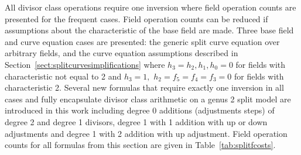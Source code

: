 All divisor class operations require one inversion where field operation counts
are presented for the frequent cases. Field operation counts can be reduced if
assumptions about the characteristic of the base field are made. Three base
field and curve equation cases are presented: the generic split curve equation
over arbitrary fields, and the curve equation assumptions described in
Section~\ref{sect:splitcurvesimplifications} where $h_3=h_2,h_1,h_0 =0$ for
fields with characteristic not equal to 2 and $h_3 = 1,$ $h_2 = f_5 = f_4 = f_3
= 0$ for fields with characteristic 2. Several new formulas that require exactly
one inversion in all cases and fully encapsulate divisor class arithmetic on a
genus 2 split model are introduced in this work including degree 0 additions
(adjustments steps) of degree 2 and degree 1 divisors, degree 1 with 1 addition
with up or down adjustments and degree 1 with 2 addition with up adjustment.
Field operation counts for all formulas from this section are given in
Table~\ref{tab:splitfcosts}.



